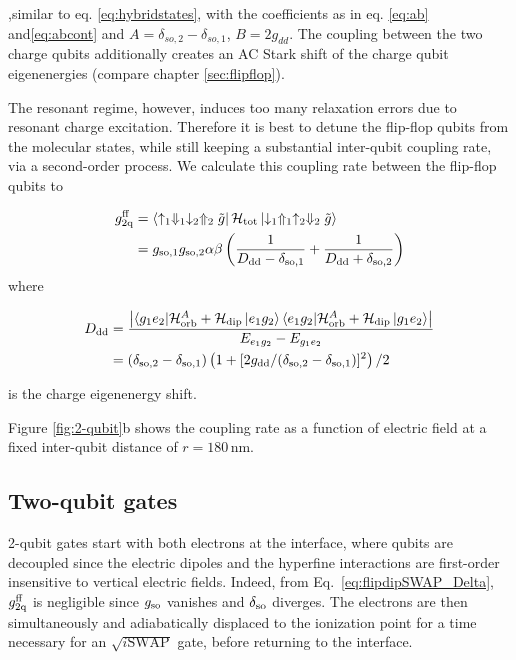 ,similar to eq. \eqref{eq:hybridstates}, with the coefficients as in eq. \eqref{eq:ab} and\eqref{eq:abcont} and $A=\delta_{so,2}-\delta_{so,1}$, $B=2g_{dd}$. The coupling between the two charge qubits additionally creates an AC Stark shift of the charge qubit eigenenergies (compare chapter \ref{sec:flipflop}).

The resonant regime, however, induces too many relaxation errors due to resonant charge excitation. Therefore it is best to detune the flip-flop qubits from the molecular states, while still keeping a substantial inter-qubit coupling rate, via a second-order process.
 We calculate this coupling rate between the flip-flop qubits to 
 
 \begin{equation}
 \label{eq:flipdipSWAP_Delta}
 \begin{aligned}
g_{\rm 2q}^{\rm ff} &= \bra{\uparrow_1\Downarrow_1 \downarrow_2\Uparrow_2 \tilde{g}}\mathcal{H}_{\rm tot}\ket{\downarrow_1\Uparrow_1 \uparrow_2\Downarrow_2 \tilde{g}} \\
& = g_{\rm so,1}g_{\rm so,2}\alpha\beta\left(\frac{1}{D_{\rm dd}-\delta_{\rm so,1}}+\frac{1}{D_{\rm dd}+\delta_{\rm so,2}}\right)
\end{aligned}
\end{equation}
where 

\begin{equation}\label{eq:Ddd}
\begin{aligned}
D_{\rm dd}&=\frac{\left| \langle g_1 e_2|\mathcal{H}_{\rm orb}^A+\mathcal{H}_{\rm dip}\ket{e_1 g_2}\langle e_1 g_2 |\mathcal{H}_{\rm orb}^A +\mathcal{H}_{\rm dip}\ket{g_1 e_2 }\right|}{E_{e_1 g_2}-E_{g_1 e_2}}\\
& =  (\delta_{\rm so,2}-\delta_{\rm so,1})\left(1+[2g_{\rm dd}/(\delta_{\rm so,2}-\delta_{\rm so,1})]^2\right)/2
\end{aligned}
\end{equation}

 is the charge eigenenergy shift.

Figure \ref{fig:2-qubit}b shows the coupling rate as a function of electric field at a fixed inter-qubit distance of $r=180\,$nm. 


\subsection{Two-qubit gates} \label{sec:2q_gates}

2-qubit gates start with both electrons at the interface, where qubits are decoupled since the electric dipoles and the hyperfine interactions are first-order insensitive to vertical electric fields. Indeed, from Eq.~\ref{eq:flipdipSWAP_Delta}, $g_{\rm 2q}^{\rm ff}$ is negligible since $g_{\rm so}$ vanishes and $\delta_{\rm so}$ diverges. The electrons are then simultaneously and adiabatically displaced to the ionization point for a time necessary for an $\sqrt{i\mathrm{SWAP}}$ gate, before returning to the interface. 

